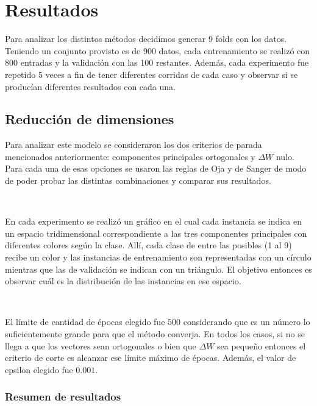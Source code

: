 \documentclass[informe.tex]{subfiles}
\begin{document}
  
  \section{Resultados}
    Para analizar los distintos métodos decidimos generar 9 folds con los datos. Teniendo un conjunto provisto es de 900 datos, cada entrenamiento se realiz\'o con 800 entradas y la validación con las 100 restantes. Además, cada experimento fue repetido 5 veces a fin de tener diferentes corridas de cada caso y observar si se produc\'ian diferentes resultados con cada una.
    
    \subsection{Reducción de dimensiones}
      Para analizar este modelo se consideraron los dos criterios de parada mencionados anteriormente: componentes principales ortogonales y $\Delta W$ nulo. Para cada una de esas opciones se usaron las reglas de Oja y de Sanger de modo de poder probar las distintas combinaciones y comparar sus resultados. 
      
      ~
      
      En cada experimento se realizó un gráfico en el cual cada instancia se indica en un espacio tridimensional correspondiente a las tres componentes principales con diferentes colores según la clase. Allí, cada clase de entre las posibles (1 al 9) recibe un color y las instancias de entrenamiento son representadas con un círculo mientras que las de validación se indican con un triángulo. El objetivo entonces es observar cuál es la distribución de las instancias en ese espacio.
      
      ~
      
      El l\'imite de cantidad de \'epocas elegido fue $500$ considerando que es un n\'umero lo suficientemente grande para que el método converja. En todos los casos, si no se llega a que los vectores sean ortogonales o bien que $\Delta W$ sea pequeño entonces el criterio de corte es alcanzar ese límite máximo de épocas. Además, el valor de epsilon elegido fue $0.001$.

      \subsubsection{Resumen de resultados}
      
\end{document}
